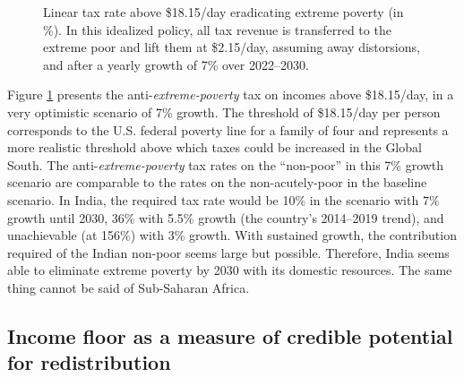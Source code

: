\documentclass[12pt,english]{article}
\begin{document}
\begin{figure}[h!]
  \caption[Anti-\textit{extreme-poverty} tax above \$18.15/day in 2030 after 3\% growth.]{Linear tax rate above \$18.15/day eradicating extreme poverty (in \%). In this idealized policy, all tax revenue is transferred to the extreme poor and lift them at \$2.15/day, assuming away distorsions, and after a yearly growth of 7\% over 2022--2030.
  }\label{fig:antipoverty_tax_18}
\end{figure}

Figure \ref{fig:antipoverty_tax_18} presents the anti-\textit{extreme-poverty} tax on incomes above \$18.15/day, in a very optimistic scenario of 7\% growth. The threshold of \$18.15/day per person corresponds to the U.S. federal poverty line for a family of four and represents a more realistic threshold above which taxes could be increased in the Global South. The anti-\textit{extreme-poverty} tax rates on the ``non-poor'' %
in this 7\% growth scenario are comparable to the rates on the non-acutely-poor in the baseline scenario. In India, the required tax rate would be 10\% %
in the scenario with 7\% growth until 2030, 36\% with 5.5\% growth (the country's 2014--2019 trend), and unachievable (at 156\%) with 3\% growth. %
With sustained growth, the contribution required of the Indian non-poor seems large but possible. %
Therefore, India seems able to eliminate extreme poverty by 2030 with its domestic resources. The same thing cannot be said of Sub-Saharan Africa. %
\subsection{Income floor as a measure of credible potential for redistribution\label{subsec:floor}}
\end{document}
